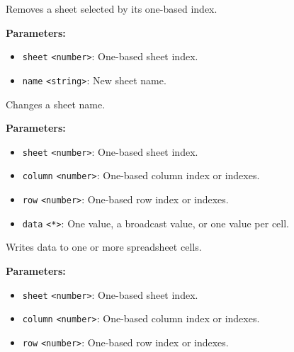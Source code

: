 \documentclass[12pt,a4paper]{article}
\begin{document}
\noindent Removes a sheet selected by its one-based index.

\vspace{5mm}
\noindent {}


\noindent \textbf{Parameters:}
\begin{itemize}
  \item \texttt{sheet} \texttt{<number>}: One-based sheet index.
  \item \texttt{name} \texttt{<string>}: New sheet name.
\end{itemize}

\noindent Changes a sheet name.

\vspace{5mm}
\noindent {}


\noindent \textbf{Parameters:}
\begin{itemize}
  \item \texttt{sheet} \texttt{<number>}: One-based sheet index.
  \item \texttt{column} \texttt{<number>}: One-based column index or indexes.
  \item \texttt{row} \texttt{<number>}: One-based row index or indexes.
  \item \texttt{data} \texttt{<*>}: One value, a broadcast value, or one value per cell.
\end{itemize}

\noindent Writes data to one or more spreadsheet cells.

\vspace{5mm}
\noindent {}


\noindent \textbf{Parameters:}
\begin{itemize}
  \item \texttt{sheet} \texttt{<number>}: One-based sheet index.
  \item \texttt{column} \texttt{<number>}: One-based column index or indexes.
  \item \texttt{row} \texttt{<number>}: One-based row index or indexes.
\end{itemize}
\end{document}
